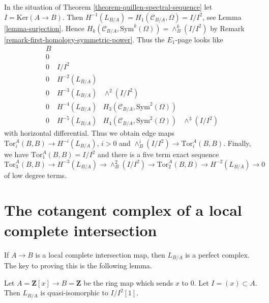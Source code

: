 \begin{remark}
\label{remark-elucidate-ss}
In the situation of Theorem \ref{theorem-quillen-spectral-sequence}
let $I = \text{Ker}(A \to B)$. Then
$H^{-1}(L_{B/A}) = H_1(\mathcal{C}_{B/A}, \Omega) = I/I^2$, see
Lemma \ref{lemma-surjection}.
Hence $H_k(\mathcal{C}_{B/A}, \text{Sym}^k(\Omega)) = \wedge^k_B(I/I^2)$ by
Remark \ref{remark-first-homology-symmetric-power}. Thus the
$E_1$-page looks like
$$
\begin{matrix}
B \\
0 \\
0 & I/I^2 \\
0 & H^{-2}(L_{B/A}) \\
0 & H^{-3}(L_{B/A}) & \wedge^2(I/I^2) \\
0 & H^{-4}(L_{B/A}) & H_3(\mathcal{C}_{B/A}, \text{Sym}^2(\Omega)) \\
0 & H^{-5}(L_{B/A}) & H_4(\mathcal{C}_{B/A}, \text{Sym}^2(\Omega)) &
\wedge^3(I/I^2)
\end{matrix}
$$
with horizontal differential. Thus we obtain edge maps
$\text{Tor}_i^A(B, B) \to H^{-i}(L_{B/A})$, $i > 0$ and
$\wedge^i_B(I/I^2) \to \text{Tor}_i^A(B, B)$. Finally, we have
$\text{Tor}_1^A(B, B) = I/I^2$ and there is a
five term exact sequence
$$
\text{Tor}_3^A(B, B) \to H^{-3}(L_{B/A}) \to \wedge^2_B(I/I^2) \to
\text{Tor}_2^A(B, B) \to H^{-2}(L_{B/A}) \to 0
$$
of low degree terms.
\end{remark}





\section{The cotangent complex of a local complete intersection}
\label{section-lci}

\noindent
If $A \to B$ is a local complete intersection map, then
$L_{B/A}$ is a perfect complex. The key to proving this is
the following lemma.

\begin{lemma}
\label{lemma-special-case}
Let $A = \mathbf{Z}[x] \to B = \mathbf{Z}$ be the ring map which sends
$x$ to $0$. Let $I = (x) \subset A$. Then $L_{B/A}$ is quasi-isomorphic to
$I/I^2[1]$.
\end{lemma}

